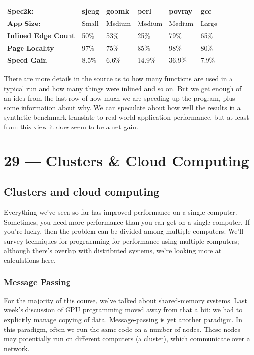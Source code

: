 \documentclass[a4paper]{report}
\begin{document}
\begin{center}
\begin{tabular}{l|l|l|l|l|l}
	\textbf{Spec2k:} & \textbf{sjeng} & \textbf{gobmk} & \textbf{perl} & \textbf{povray} & \textbf{gcc}\\ \hline
	\textbf{App Size:} &  {Small} & {Medium} & {Medium} & {Medium} & {Large} \\ \hline
	\textbf{Inlined Edge Count} & 50\% & 53\% & 25\% & 79\% & 65\% \\ \hline
	\textbf{Page Locality} & 97\% & 75\% & 85\% & 98\% & 80\% \\ \hline
	\textbf{Speed Gain} & 8.5\% & 6.6\% & 14.9\% & 36.9\% & 7.9\% \\ 
\end{tabular}
\end{center}

There are more details in the source as to how many functions are used in a typical run and how many things were inlined and so on. But we get enough of an idea from the last row of how much we are speeding up the program, plus some information about why. We can speculate about how well the results in a synthetic benchmark translate to real-world application performance, but at least from this view it does seem to be a net gain.








\chapter*{29 --- Clusters \& Cloud Computing}


\section*{Clusters and cloud computing}
Everything we've seen so far has improved performance on a single
computer. Sometimes, you need more performance than you can get on a
single computer. If you're lucky, then the problem can be divided
among multiple computers. We'll survey techniques for programming for
performance using multiple computers; although there's overlap with
distributed systems, we're looking more at calculations here.

\subsection*{Message Passing} For the majority of this course, 
we've talked about shared-memory systems. Last week's discussion of
GPU programming moved away from that a bit: we had to explicitly
manage copying of data. Message-passing is yet another paradigm.  In
this paradigm, often we run the same code on a number of nodes. These
nodes may potentially run on different computers (a cluster),
which communicate over a network.
\end{document}
